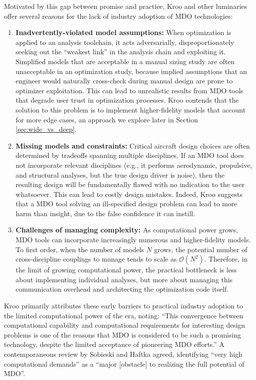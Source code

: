 Motivated by this gap between promise and practice, Kroo and other luminaries offer several reasons for the lack of industry adoption of MDO technologies:

\begin{enumerate}
    \item \textbf{Inadvertently-violated model assumptions:} When optimization is applied to an analysis toolchain, it acts adversarially, disproportionately seeking out the ``weakest link'' in the analysis chain and exploiting it. Simplified models that are acceptable in a manual sizing study are often unacceptable in an optimization study, because implied assumptions that an engineer would naturally cross-check during manual design are prone to optimizer exploitation. This can lead to unrealistic results from MDO tools that degrade user trust in optimization processes. Kroo contends that the solution to this problem is to implement higher-fidelity models that account for more edge cases, an approach we explore later in Section \ref{sec:wide_vs_deep}.
    \item \textbf{Missing models and constraints:} Critical aircraft design choices are often determined by tradeoffs spanning multiple disciplines. If an MDO tool does not incorporate relevant disciplines (e.g., it performs aerodynamic, propulsive, and structural analyses, but the true design driver is noise), then the resulting design will be fundamentally flawed with no indication to the user whatsoever. This can lead to costly design mistakes. Indeed, Kroo suggests that a MDO tool solving an ill-specified design problem can lead to more harm than insight, due to the false confidence it can instill.
    \item \textbf{Challenges of managing complexity:} As computational power grows, MDO tools can incorporate increasingly numerous and higher-fidelity models. To first order, when the number of models $N$ grows, the potential number of cross-discipline couplings to manage tends to scale as $\mathcal{O}(N^2)$. Therefore, in the limit of growing computational power, the practical bottleneck is less about implementing individual analyses, but more about managing this communication overhead and architecting the optimization code itself.
\end{enumerate}

Kroo primarily attributes these early barriers to practical industry adoption to the limited computational power of the era, noting: ``This convergence between computational capability and computational requirements for interesting design problems is one of the reasons that MDO is considered to be such a promising technology, despite the limited acceptance of pioneering MDO efforts.'' A contemporaneous review by Sobieski and Haftka agreed, identifying ``very high computational demands'' as a ``major [obstacle] to realizing the full potential of MDO''. \cite{haftka_multidisciplinary_1997}

